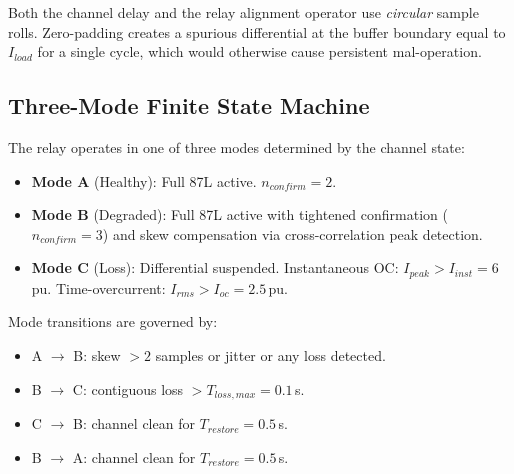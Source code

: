 \documentclass[12pt,a4paper]{article}
\begin{document}
Both the channel delay and the relay alignment operator use \emph{circular}
sample rolls.  Zero-padding creates a spurious differential at the buffer
boundary equal to $I_{load}$ for a single cycle, which would otherwise cause
persistent mal-operation.

\subsection{Three-Mode Finite State Machine}
\label{sec:87L_fsm}

The relay operates in one of three modes determined by the channel state:
\begin{itemize}
  \item \textbf{Mode A} (Healthy): Full 87L active.  $n_{confirm} = 2$.
  \item \textbf{Mode B} (Degraded): Full 87L active with tightened
        confirmation ($n_{confirm} = 3$) and skew compensation via
        cross-correlation peak detection.
  \item \textbf{Mode C} (Loss): Differential suspended.
        Instantaneous OC: $I_{peak} > I_{inst} = 6$\,pu.
        Time-overcurrent: $I_{rms} > I_{oc} = 2.5$\,pu.
\end{itemize}

Mode transitions are governed by:
\begin{itemize}
  \item A $\to$ B: skew $> 2$ samples or jitter or any loss detected.
  \item B $\to$ C: contiguous loss $> T_{loss,max} = 0.1$\,s.
  \item C $\to$ B: channel clean for $T_{restore} = 0.5$\,s.
  \item B $\to$ A: channel clean for $T_{restore} = 0.5$\,s.
\end{itemize}
\end{document}
